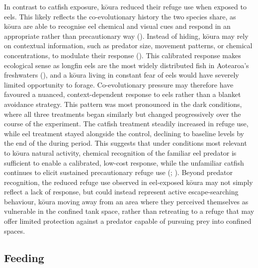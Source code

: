 \documentclass[
  letterpaper,
  DIV=11,
  numbers=noendperiod]{scrartcl}
\begin{document}
In contrast to catfish exposure, kōura reduced their refuge use when
exposed to eels. This likely reflects the co-evolutionary history the
two species share, as kōura are able to recognise eel chemical and
visual cues and respond in an appropriate rather than precautionary way
(). Instead of hiding, kōura
may rely on contextual information, such as predator size, movement
patterns, or chemical concentrations, to modulate their response
(). This calibrated
response makes ecological sense as longfin eels are the most widely
distributed fish in Aotearoa's freshwaters
(), and a kōura living in
constant fear of eels would have severely limited opportunity to forage.
Co-evolutionary pressure may therefore have favoured a nuanced,
context-dependent response to eels rather than a blanket avoidance
strategy. This pattern was most pronounced in the dark conditions, where
all three treatments began similarly but changed progressively over the
course of the experiment. The catfish treatment steadily increased in
refuge use, while eel treatment stayed alongside the control, declining
to baseline levels by the end of the during period. This suggests that
under conditions most relevant to kōura natural activity, chemical
recognition of the familiar eel predator is sufficient to enable a
calibrated, low-cost response, while the unfamiliar catfish continues to
elicit sustained precautionary refuge use
(;
). Beyond predator
recognition, the reduced refuge use observed in eel-exposed kōura may
not simply reflect a lack of response, but could instead represent
active escape-searching behaviour, kōura moving away from an area where
they perceived themselves as vulnerable in the confined tank space,
rather than retreating to a refuge that may offer limited protection
against a predator capable of pursuing prey into confined spaces.

\subsection{Feeding}\label{feeding}
\end{document}
